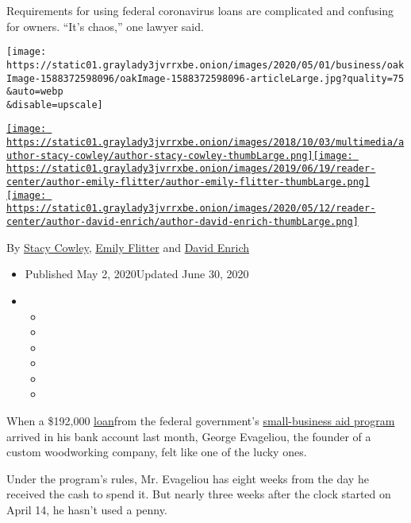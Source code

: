 Requirements for using federal coronavirus loans are complicated and
confusing for owners. ``It's chaos,'' one lawyer said.

\texttt{[image: https://static01.graylady3jvrrxbe.onion/images/2020/05/01/business/oakImage-1588372598096/oakImage-1588372598096-articleLarge.jpg?quality=75\\\&auto=webp\\\&disable=upscale]}

\href{https://www.nytimes3xbfgragh.onion/by/stacy-cowley}{\texttt{[image: https://static01.graylady3jvrrxbe.onion/images/2018/10/03/multimedia/author-stacy-cowley/author-stacy-cowley-thumbLarge.png]}}\href{https://www.nytimes3xbfgragh.onion/by/emily-flitter}{\texttt{[image: https://static01.graylady3jvrrxbe.onion/images/2019/06/19/reader-center/author-emily-flitter/author-emily-flitter-thumbLarge.png]}}\href{https://www.nytimes3xbfgragh.onion/by/david-enrich}{\texttt{[image: https://static01.graylady3jvrrxbe.onion/images/2020/05/12/reader-center/author-david-enrich/author-david-enrich-thumbLarge.png]}}

By \href{https://www.nytimes3xbfgragh.onion/by/stacy-cowley}{Stacy
Cowley},
\href{https://www.nytimes3xbfgragh.onion/by/emily-flitter}{Emily
Flitter} and
\href{https://www.nytimes3xbfgragh.onion/by/david-enrich}{David Enrich}

\begin{itemize}
\item
  Published May 2, 2020Updated June 30, 2020
\item
  \begin{itemize}
  \item
  \item
  \item
  \item
  \item
  \item
  \end{itemize}
\end{itemize}

When a \$192,000
\href{https://www.nytimes3xbfgragh.onion/2020/05/13/business/paycheck-protection-program-small-business.html}{loan}from
the federal government's
\href{https://www.nytimes3xbfgragh.onion/2020/05/13/business/paycheck-protection-program-small-business.html}{small-business
aid program} arrived in his bank account last month, George Evageliou,
the founder of a custom woodworking company, felt like one of the lucky
ones.

Under the program's rules, Mr. Evageliou has eight weeks from the day he
received the cash to spend it. But nearly three weeks after the clock
started on April 14, he hasn't used a penny.

